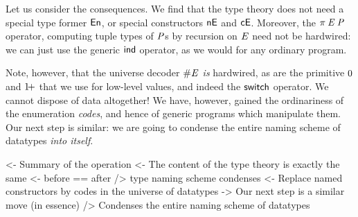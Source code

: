 Let us consider the consequences. We find that the type
theory does not need a special type former $\EnumU$,
or special constructors $\NilE$ and $\SYMBConsE$. 
Moreover, the $\spi{\M{E}}{\M{P}}$ operator, computing tuple types
of \(\mathit{P}\)s by recursion on \(\mathit{E}\) need not be hardwired: we can
just use the generic $\F{ind}$ operator, as we would for any ordinary
program.

Note, however, that the universe decoder \(\EnumT{\M{E}}\) \emph{is}
hardwired, as are the primitive \(\Ze\) and \(\Su\) that
we use for low-level values, and indeed the \(\SYMBswitch\) operator.
We cannot dispose of data altogether! We have, however, gained
the ordinariness of the enumeration \emph{codes}, and hence of generic
programs which manipulate them. Our next step is similar: we are going to
condense the entire naming scheme of datatypes \emph{into itself}.


\begin{wstructure}
<- Summary of the operation
    <- The content of the type theory is exactly the same
        <- before == after
    /> type naming scheme condenses
        <- Replace named constructors by codes in the universe of datatypes
    -> Our next step is a similar move (in essence)
        /> Condenses the entire naming scheme of datatypes
\end{wstructure}



